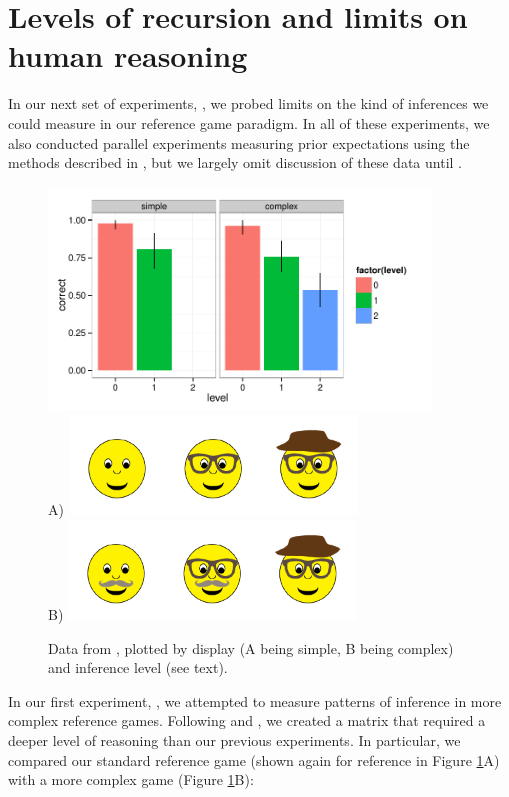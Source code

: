\section{Levels of recursion and limits on human reasoning}
\label{sec:levels}

In our next set of experiments, , we probed limits on the kind of inferences we could measure in our reference game paradigm. In all of these experiments, we also conducted parallel experiments measuring prior expectations using the methods described in , but we largely omit discussion of these data until . 


 \begin{figure}[t]
  \centering
  \includegraphics[width=4in]{../plots/3-levels-levels.pdf}\\ 
  A) \includegraphics[width=3in]{figures/hatglasses.pdf}\\
  B) \includegraphics[width=3in]{figures/levels-levels-stim.pdf}
  \caption{\label{fig:levels-level} Data from , plotted by display (A being simple, B being complex) and inference level (see text).}
\end{figure}


In our first experiment, , we attempted to measure patterns of inference in more complex reference games. Following  and , we created a matrix that required a deeper level of reasoning than our previous experiments. In particular, we compared our standard reference game (shown again for reference in Figure \ref{fig:levels-level}A) with a more complex game (Figure \ref{fig:levels-level}B):


